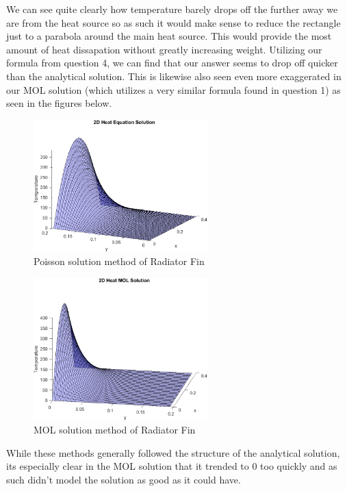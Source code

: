 \documentclass{article}
\begin{document}
We can see quite clearly how temperature barely drops off the further away we are from the heat source so as such it would make sense to reduce the rectangle just to a parabola around the main heat source. This would provide the most amount of heat dissapation without greatly increasing weight.
Utilizing our formula from question 4, we can find that our answer seems to drop off quicker than the analytical solution. This is likewise also seen even more exaggerated in our MOL solution (which utilizes a very similar formula found in question 1) as seen in the figures below.
\begin{figure}[H]
    \centering 
    \includegraphics[width=0.6\textwidth]{FinPoisson.png}
    \caption{Poisson solution method of Radiator Fin}
\end{figure}
\begin{figure}[H]
    \centering
    \includegraphics[width=0.6\textwidth]{FinMOL.png}
    \caption{MOL solution method of Radiator Fin}
\end{figure}

While these methods generally followed the structure of the analytical solution, its especially clear in the MOL solution that it trended to 0 too quickly and as such didn't model the solution as good as it could have.











\end{document}
